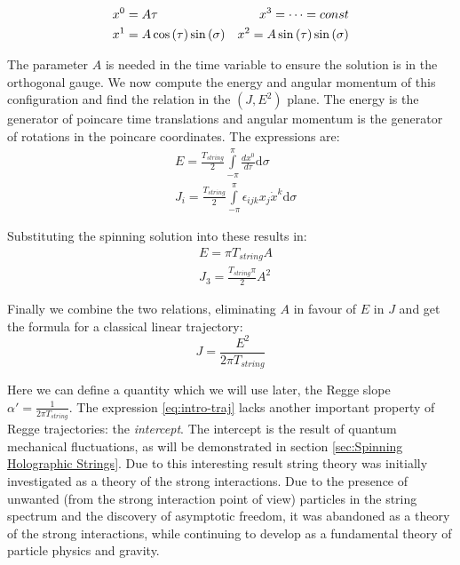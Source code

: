 \documentclass[11pt,a4paper]{article}
\begin{document}
\begin{align}
&x^0=A\tau &x^3=\cdots=const\notag\\
&x^1=A\cos\left(\tau\right)\sin\left(\sigma\right) &x^2=A\sin\left(\tau\right)\sin\left(\sigma\right)
\end{align}

The parameter $A$ is needed in the time variable to ensure the solution is in the orthogonal gauge. We now compute the energy and angular momentum of this configuration and find the relation in the $\left(J,E^2\right)$ plane. The energy is the generator of poincare time translations and angular momentum is the generator of rotations in the poincare coordinates. The expressions are:
\begin{subequations}
\begin{align}
&E=\frac{T_{string}}{2}\int\limits_{-\pi}^{\pi} \frac{dx^0}{d\tau} \mathrm{d}\sigma  \\
&J_i=\frac{T_{string}}{2}\int\limits_{-\pi}^{\pi}\epsilon_{ijk}x_j \dot{x}^k \mathrm{d}\sigma
\end{align}
\end{subequations}

Substituting the spinning solution into these results in:
\begin{subequations}
\begin{align}
&E=\pi T_{string} A \\
&J_3=\frac{T_{string}\pi}{2}A^2
\end{align}
\end{subequations}

Finally we combine the two relations, eliminating $A$ in favour of $E$ in $J$ and get the formula for a classical linear trajectory:
\begin{equation}
\label{eq:intro-traj}
J=\frac{E^2}{2\pi T_{string}}
\end{equation}

Here we can define a quantity which we will use later, the Regge slope $\alpha'=\frac{1}{2\pi T_{string}}$. The expression \ref{eq:intro-traj} lacks another important property of Regge trajectories: the \emph{intercept}. The intercept is the result of quantum mechanical fluctuations, as will be demonstrated in section \ref{sec:Spinning Holographic Strings}. Due to this interesting result string theory was initially investigated as a theory of the strong interactions. Due to the presence of unwanted (from the strong interaction point of view) particles in the string spectrum and the discovery of asymptotic freedom, it was abandoned as a theory of the strong interactions, while continuing to develop as a fundamental theory of particle physics and gravity.
\end{document}
